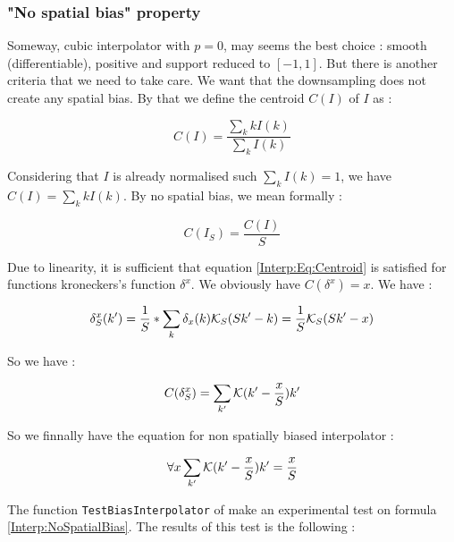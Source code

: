 
\subsubsection{"No spatial bias" property}

Someway,  cubic interpolator  with $p=0$, may seems the best choice : smooth (differentiable), positive and support
reduced to $[-1,1]$.  But there  is another criteria that we need to take care.   We want that the
downsampling does not create any spatial bias. By that we define the centroid $C(I)$ of $I$
as  :

\begin{equation}
    C(I)  =  \frac{\sum_k k I(k)} {\sum_k I(k)}
\end{equation}

Considering that $I$ is already normalised such $\sum_k I(k)=1$, we have
$C(I) = \sum_k k I(k)$. By no spatial bias, we mean formally :


\begin{equation}
    C(I_S)  =  \frac{C(I)}{S} \label{Interp:Eq:Centroid}
\end{equation}

Due to linearity, it is sufficient that equation \ref{Interp:Eq:Centroid} is satisfied
for functions kroneckers's function $\delta^x$. We obviously have $C(\delta^x) = x$.
We have :

\begin{equation}
    \delta^x_S(k') = \frac{1}{S} *  \sum_{k}  \delta_x(k)  \mathcal K_S(S k'-k ) =  \frac{1}{S} \mathcal K_S(S k'-x)
\end{equation}

So we have :

\begin{equation}
    C(\delta^x_S) =  \sum_{k'}  \mathcal K(k'-\frac{x}{S}) k'  
\end{equation}


So we finnally have the equation for non spatially biased interpolator :

\begin{equation}
   \forall x     \sum_{k'}  \mathcal K(k'-\frac{x}{S}) k'  = \frac{x}{S} \label{Interp:NoSpatialBias}
\end{equation}


The function {\tt TestBiasInterpolator} of \PPP make an experimental test on formula
\ref{Interp:NoSpatialBias}. The results of this test is the following :

